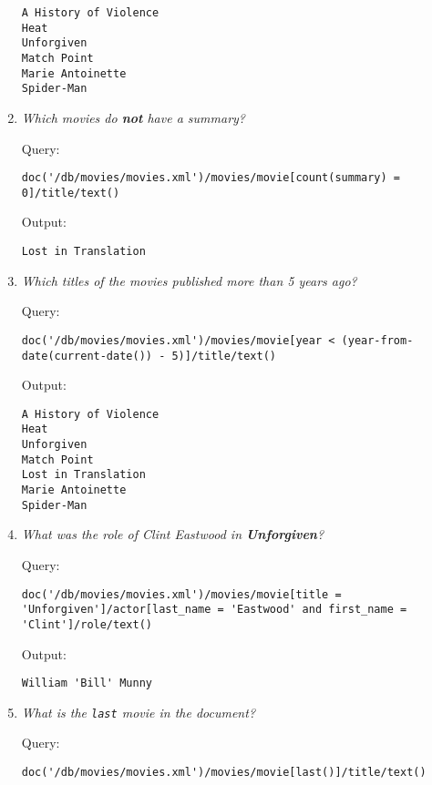\documentclass[a4paper, notitlepage]{article}
\begin{document}
\begin{enumerate}
\begin{lstlisting}
A History of Violence
Heat
Unforgiven
Match Point
Marie Antoinette
Spider-Man
\end{lstlisting}


\item
  \emph{Which movies do \textbf{not} have a summary?}
  
Query:
  
\begin{lstlisting}
doc('/db/movies/movies.xml')/movies/movie[count(summary) = 0]/title/text()
\end{lstlisting}
  
Output:
  
\begin{lstlisting}
Lost in Translation
\end{lstlisting}

\item
  \emph{Which titles of the movies published more than 5 years ago? }
  
Query:
  
\begin{lstlisting}
doc('/db/movies/movies.xml')/movies/movie[year < (year-from-date(current-date()) - 5)]/title/text()
\end{lstlisting}
  
Output:
  
\begin{lstlisting}
A History of Violence
Heat
Unforgiven
Match Point
Lost in Translation
Marie Antoinette
Spider-Man
\end{lstlisting}

\item
  \emph{ What was the role of Clint Eastwood in \textbf{Unforgiven}? }
  
Query:
  
\begin{lstlisting}
doc('/db/movies/movies.xml')/movies/movie[title = 'Unforgiven']/actor[last_name = 'Eastwood' and first_name = 'Clint']/role/text()
\end{lstlisting}
  
Output:
  
\begin{lstlisting}
William 'Bill' Munny
\end{lstlisting}
  

\item
  \emph{ What is the \lstinline{last} movie in the document? }
  
Query:
  
\begin{lstlisting}
doc('/db/movies/movies.xml')/movies/movie[last()]/title/text()
\end{lstlisting}
  

\end{enumerate}
\end{document}

